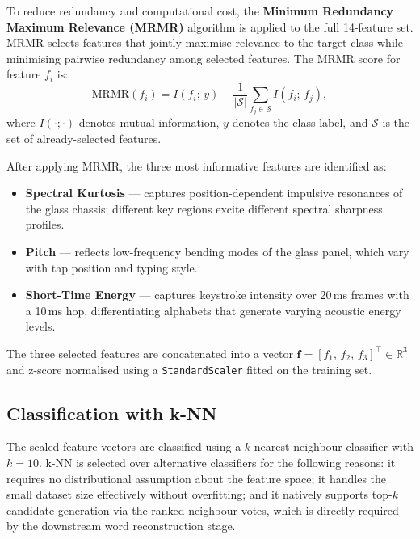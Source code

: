 \documentclass[conference]{IEEEtran}
\begin{document}
To reduce redundancy and computational cost, the
\textbf{Minimum Redundancy Maximum Relevance (MRMR)} algorithm is
applied to the full 14-feature set.
MRMR selects features that jointly maximise relevance to the target
class while minimising pairwise redundancy among selected features.
The MRMR score for feature $f_i$ is:
\begin{equation}
  \mathrm{MRMR}(f_i)
    = I(f_i;\, y)
      - \frac{1}{|\mathcal{S}|}
        \sum_{f_j \in \mathcal{S}} I(f_i;\, f_j),
\end{equation}
where $I(\cdot;\cdot)$ denotes mutual information,
$y$ denotes the class label, and $\mathcal{S}$ is the set of
already-selected features.

After applying MRMR, the three most informative features are
identified as:
\begin{itemize}
  \item \textbf{Spectral Kurtosis} — captures position-dependent
        impulsive resonances of the glass chassis; different key
        regions excite different spectral sharpness profiles.
  \item \textbf{Pitch} — reflects low-frequency bending modes of
        the glass panel, which vary with tap position and typing
        style.
  \item \textbf{Short-Time Energy} — captures keystroke intensity
        over 20\,ms frames with a 10\,ms hop, differentiating
        alphabets that generate varying acoustic energy levels.
\end{itemize}

The three selected features are concatenated into a vector
$\mathbf{f} = [f_1,\, f_2,\, f_3]^\top \in \mathbb{R}^3$ and
z-score normalised using a \texttt{StandardScaler} fitted on the
training set.

\subsection{Classification with k-NN}

The scaled feature vectors are classified using a
$k$-nearest-neighbour classifier with $k{=}10$.
k-NN is selected over alternative classifiers for the following
reasons: it requires no distributional assumption about the feature
space; it handles the small dataset size effectively without
overfitting; and it natively supports top-$k$ candidate generation
via the ranked neighbour votes, which is directly required by the
downstream word reconstruction stage.
\end{document}
